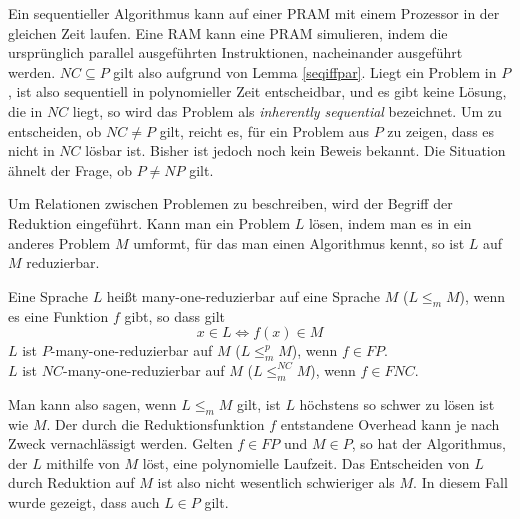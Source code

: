 %
Ein sequentieller Algorithmus kann auf einer PRAM mit einem Prozessor in der
gleichen Zeit laufen.
Eine RAM kann eine PRAM simulieren, indem die ursprünglich parallel
ausgeführten Instruktionen, nacheinander ausgeführt werden.
$NC \subseteq P$ gilt also aufgrund von Lemma \ref{seqiffpar}.
%
Liegt ein Problem in $P$, ist also sequentiell in polynomieller Zeit
entscheidbar, und es gibt keine Lösung, die in $NC$ liegt, so wird das
Problem als \emph{inherently sequential} bezeichnet.
Um zu entscheiden, ob $NC \neq P$ gilt, reicht es, für ein Problem aus $P$ zu
zeigen, dass es nicht in $NC$ lösbar ist.
Bisher ist jedoch noch kein Beweis bekannt.
Die Situation ähnelt der Frage, ob $P \neq NP$ gilt.

Um Relationen zwischen Problemen zu beschreiben, wird der Begriff der
Reduktion eingeführt.
Kann man ein Problem $L$ lösen, indem man es in ein anderes Problem $M$ umformt,
für das man einen Algorithmus kennt, so ist $L$ auf $M$ reduzierbar.
%
\begin{define}
    Eine Sprache $L$ heißt many-one-reduzierbar auf eine Sprache $M$
    ($L \leq_m M$), wenn es eine Funktion $f$ gibt, so dass gilt
    \begin{equation}
        x \in L \Leftrightarrow f(x) \in M
    \end{equation}
    $L$ ist $P$-many-one-reduzierbar auf $M$ ($L \leq_m^p M$), wenn $f \in FP$. \\
    $L$ ist $NC$-many-one-reduzierbar auf $M$ ($L \leq_m^{NC} M$), wenn $f \in FNC$.
    \cite[S.47]{greenlaw}
\end{define}
%
Man kann also sagen, wenn $L \leq_m M$ gilt, ist $L$ höchstens so schwer zu
lösen ist wie $M$.
Der durch die Reduktionsfunktion $f$ entstandene Overhead kann je nach Zweck
vernachlässigt werden.
Gelten $f \in FP$ und $M \in P$, so hat der Algorithmus, der $L$ mithilfe von
$M$ löst, eine polynomielle Laufzeit.
Das Entscheiden von $L$ durch Reduktion auf $M$ ist also nicht wesentlich
schwieriger als $M$.
In diesem Fall wurde gezeigt, dass auch $L \in P$ gilt.

